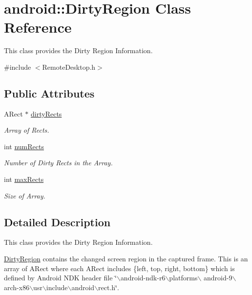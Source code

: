 \hypertarget{classandroid_1_1DirtyRegion}{\section{android\-:\-:\-Dirty\-Region \-Class \-Reference}
\label{classandroid_1_1DirtyRegion}
}


\-This class provides the \-Dirty \-Region \-Information.  




{\ttfamily \#include $<$\-Remote\-Desktop.\-h$>$}

\subsection*{\-Public \-Attributes}
\begin{DoxyCompactItemize}
\item 
\-A\-Rect $\ast$ \hyperlink{classandroid_1_1DirtyRegion_af955c947f1cbfd7d8d3ac2ebc1f4dd1c}{dirty\-Rects}
\begin{DoxyCompactList}\small\item\em \-Array of \-Rects. \end{DoxyCompactList}\item 
int \hyperlink{classandroid_1_1DirtyRegion_aeabb1d1a06ce3c442297c665d3f8fae2}{num\-Rects}
\begin{DoxyCompactList}\small\item\em \-Number of \-Dirty \-Rects in the \-Array. \end{DoxyCompactList}\item 
int \hyperlink{classandroid_1_1DirtyRegion_ac278f2e84eea4692a961951fefefa598}{max\-Rects}
\begin{DoxyCompactList}\small\item\em \-Size of \-Array. \end{DoxyCompactList}\end{DoxyCompactItemize}


\subsection{\-Detailed \-Description}
\-This class provides the \-Dirty \-Region \-Information. 

\hyperlink{classandroid_1_1DirtyRegion}{\-Dirty\-Region} contains the changed screen region in the captured frame. \-This is an array of \-A\-Rect where each \-A\-Rect includes \{left, top, right, bottom\} which is defined by \-Android \-N\-D\-K header file \char`\"{}$\backslash$android-\/ndk-\/r6$\backslash$platforms$\backslash$
 android-\/9$\backslash$arch-\/x86$\backslash$usr$\backslash$include$\backslash$android$\backslash$rect.\-h\char`\"{}.

